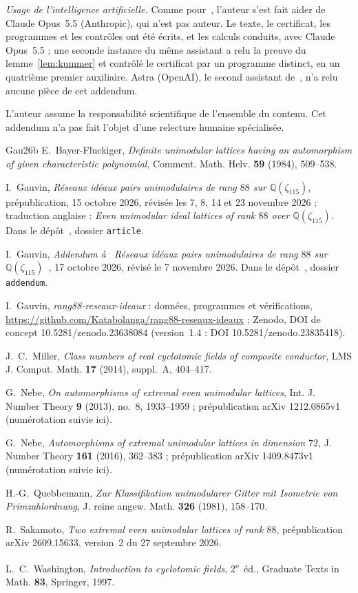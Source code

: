 \documentclass[11pt,a4paper]{amsart}
\theoremstyle{plain}
\theoremstyle{definition}
\newcommand{\Q}{\mathbb{Q}}
\begin{document}
\emph{Usage de l'intelligence artificielle.} Comme pour~\cite{Gau26}, l'auteur s'est fait aider de Claude Opus~5.5 (Anthropic), qui n'est pas auteur. Le texte, le certificat, les programmes et les contrôles ont été écrits, et les calculs conduits, avec Claude Opus~5.5 ; une seconde instance du même assistant a relu la preuve du lemme~\ref{lem:kummer} et contrôlé le certificat par un programme distinct, en un quatrième premier auxiliaire. Astra (OpenAI), le second assistant de~\cite{Gau26}, n'a relu aucune pièce de cet addendum.

L'auteur assume la responsabilité scientifique de l'ensemble du contenu. Cet addendum n'a pas fait l'objet d'une relecture humaine spécialisée.

\begin{thebibliography}{Gau26b}
E.~Bayer-Fluckiger, \emph{Definite unimodular lattices having an automorphism of given characteristic polynomial}, Comment. Math. Helv. \textbf{59} (1984), 509--538.

I.~Gauvin, \emph{Réseaux idéaux pairs unimodulaires de rang $88$ sur $\Q(\zeta_{115})$}, prépublication, 15 octobre 2026, révisée les 7, 8, 14 et 23 novembre 2026 ; traduction anglaise : \emph{Even unimodular ideal lattices of rank $88$ over $\Q(\zeta_{115})$}. Dans le dépôt~\cite{Gau26b}, dossier \texttt{article}.

I.~Gauvin, \emph{Addendum à \guillemotleft~Réseaux idéaux pairs unimodulaires de rang $88$ sur $\Q(\zeta_{115})$~\guillemotright}, 17 octobre 2026, révisé le 7 novembre 2026. Dans le dépôt~\cite{Gau26b}, dossier \texttt{addendum}.

I.~Gauvin, \emph{rang88-reseaux-ideaux} : données, programmes et vérifications, \url{https://github.com/Katabolanga/rang88-reseaux-ideaux} ; Zenodo, DOI de concept 10.5281/zenodo.23638084 (version~1.4 : DOI 10.5281/zenodo.23835418).

J.~C.~Miller, \emph{Class numbers of real cyclotomic fields of composite conductor}, LMS J. Comput. Math. \textbf{17} (2014), suppl.~A, 404--417.

G.~Nebe, \emph{On automorphisms of extremal even unimodular lattices}, Int. J. Number Theory \textbf{9} (2013), no.~8, 1933--1959 ; prépublication arXiv 1212.0865v1 (numérotation suivie ici).

G.~Nebe, \emph{Automorphisms of extremal unimodular lattices in dimension $72$}, J. Number Theory \textbf{161} (2016), 362--383 ; prépublication arXiv 1409.8473v1 (numérotation suivie ici).

H.-G.~Quebbemann, \emph{Zur Klassifikation unimodularer Gitter mit Isometrie von Primzahlordnung}, J. reine angew. Math. \textbf{326} (1981), 158--170.

R.~Sakamoto, \emph{Two extremal even unimodular lattices of rank $88$}, prépublication arXiv 2609.15633, version~2 du 27 septembre 2026.

L.~C.~Washington, \emph{Introduction to cyclotomic fields}, 2\textsuperscript{e}~éd., Graduate Texts in Math. \textbf{83}, Springer, 1997.
\end{thebibliography}
\end{document}
